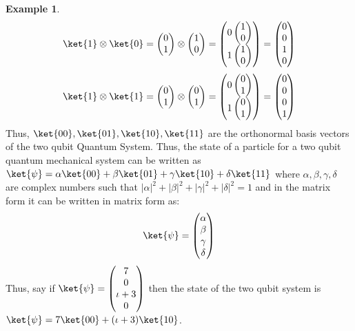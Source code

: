\documentclass[12pt, oneside]{book}
\theoremstyle{definition}
\theoremstyle{definition}
\newtheorem{example}{Example}[section]
\theoremstyle{remark}
\begin{document}
\begin{example}
    \[ \ket{1} \otimes \ket{0} = \begin{pmatrix} 0 \\ 1 \end{pmatrix} \otimes \begin{pmatrix} 1 \\ 0 \end{pmatrix} = \begin{pmatrix} 0 \begin{pmatrix} 1 \\ 0 \end{pmatrix} \\ 1 \begin{pmatrix} 1 \\ 0 \end{pmatrix} \end{pmatrix} = \begin{pmatrix} 0 \\ 0 \\ 1 \\ 0 \end{pmatrix} \]
    \[ \ket{1} \otimes \ket{1} = \begin{pmatrix} 0 \\ 1 \end{pmatrix} \otimes \begin{pmatrix} 0 \\ 1 \end{pmatrix} = \begin{pmatrix} 0 \begin{pmatrix} 0 \\ 1 \end{pmatrix} \\ 1 \begin{pmatrix} 0 \\ 1 \end{pmatrix} \end{pmatrix} = \begin{pmatrix} 0 \\ 0 \\ 0 \\ 1 \end{pmatrix} \]
Thus, $\ket{00},\ket{01},\ket{10},\ket{11}$ are the orthonormal basis vectors of the two qubit Quantum System. Thus, the state of a particle for a two qubit quantum mechanical system can be written as 
$\ket{\psi}=\alpha\ket{00}+\beta\ket{01}+\gamma\ket{10}+\delta\ket{11}$ where $\alpha,\beta,\gamma,\delta$ are complex numbers such that $|\alpha|^2+|\beta|^2+|\gamma|^2+|\delta|^2=1$ and in the matrix form it can be written in matrix form as:
\[
    \ket{\psi}=\begin{pmatrix} \alpha \\ \beta \\ \gamma \\ \delta \end{pmatrix}
\]
Thus, say if $\ket{\psi}=\begin{pmatrix} 7 \\ 0 \\ \iota +3 \\ 0 \end{pmatrix}$ then the state of the two qubit system is $\ket{\psi}=7\ket{00}+(\iota+3)\ket{10}$.
\end{example}
\end{document}
